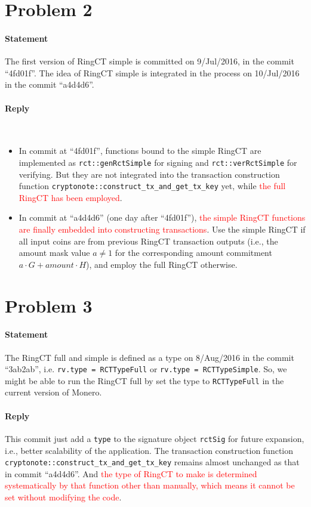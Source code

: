 \documentclass[a4paper,10pt]{article}
\begin{document}
\section{Problem 2}
\paragraph{Statement} The first version of RingCT simple is committed on 9/Jul/2016, in the commit ``4fd01f''. The idea of RingCT simple is integrated in the process on 10/Jul/2016 in the commit ``a4d4d6''.
\paragraph{Reply} ~ 
	\begin{itemize}
		\item In commit at ``4fd01f'', functions bound to the simple RingCT are implemented as \texttt{rct::genRctSimple} for signing and \texttt{rct::verRctSimple} for verifying. But they are not integrated into the transaction construction function \texttt{cryptonote::construct\_tx\_and\_get\_tx\_key} yet, while \textcolor{red}{the full RingCT has been employed}.
		\item In commit at ``a4d4d6'' (one day after ``4fd01f''), \textcolor{red}{the simple RingCT functions are finally embedded into constructing transactions}. Use the simple RingCT if all input coins are from previous RingCT transaction outputs (i.e., the amount mask value \(a\neq 1\) for the corresponding amount commitment \(a\cdot G+amount\cdot H\)), and employ the full RingCT otherwise.
	\end{itemize}
\section{Problem 3}
\paragraph{Statement} The RingCT full and simple is defined as a type on 8/Aug/2016 in the commit ``3ab2ab'', i.e. \texttt{rv.type = RCTTypeFull} or \texttt{rv.type = RCTTypeSimple}. So, we might be able to run the RingCT full by set the type to \texttt{RCTTypeFull} in the current version of Monero.
\paragraph{Reply} This commit just add a \texttt{type} to the signature object \texttt{rctSig} for future expansion, i.e., better scalability of the application. The transaction construction function \texttt{cryptonote::construct\_tx\_and\_get\_tx\_key} remains almost unchanged as that in commit ``a4d4d6''. And \textcolor{red}{the type of RingCT to make is determined systematically by that function other than manually, which means it cannot be set without modifying the code}.
\end{document}
